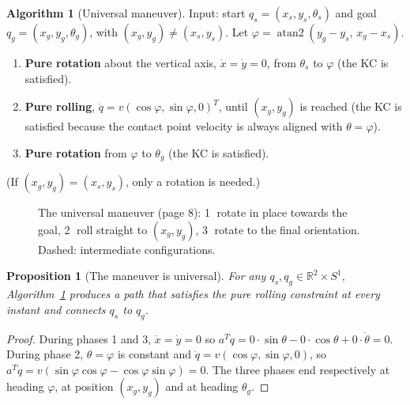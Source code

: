 \documentclass[11pt,a4paper]{article}
\newcommand{\fixedwheel}[2]{\begin{scope}[shift={(#1)},rotate=#2]
  \draw[fill=gray!30] (-0.3,-0.07) rectangle (0.3,0.07);\end{scope}}
\newcommand{\ghostwheel}[2]{\begin{scope}[shift={(#1)},rotate=#2]
  \draw[dashed,gray] (-0.3,-0.07) rectangle (0.3,0.07);\end{scope}}
\theoremstyle{definition}
\newtheorem{algorithm}[definition]{Algorithm}
\theoremstyle{plain}
\newtheorem{proposition}[definition]{Proposition}
\theoremstyle{remark}
\begin{document}
\begin{algorithm}[Universal maneuver]\label{alg:universal}
Input: start $q_s=(x_s,y_s,\theta_s)$ and goal $q_g=(x_g,y_g,\theta_g)$, with $(x_g,y_g)\neq(x_s,y_s)$. Let $\varphi=\operatorname{atan2}(y_g-y_s,\,x_g-x_s)$.
\begin{enumerate}[nosep]
  \item \textbf{Pure rotation} about the vertical axis, $\dot x=\dot y=0$, from $\theta_s$ to $\varphi$ (the KC is satisfied).
  \item \textbf{Pure rolling}, $\dot q=v(\cos\varphi,\sin\varphi,0)^{T}$, until $(x_g,y_g)$ is reached (the KC is satisfied because the contact point velocity is always aligned with $\theta=\varphi$).
  \item \textbf{Pure rotation} from $\varphi$ to $\theta_g$ (the KC is satisfied).
\end{enumerate}
(If $(x_g,y_g)=(x_s,y_s)$, only a rotation is needed.)
\end{algorithm}
 
\begin{figure}[H]
\centering
{}
\caption{The universal maneuver (page 8): \textcircled{1} rotate in place towards the goal, \textcircled{2} roll straight to $(x_g,y_g)$, \textcircled{3} rotate to the final orientation. Dashed: intermediate configurations.}
\end{figure}
 
\begin{proposition}[The maneuver is universal]\label{alg:universal}
For any $q_s,q_g\in\mathbb R^2\times S^1$, Algorithm~\ref{alg:universal} produces a path that satisfies the pure rolling constraint at every instant and connects $q_s$ to $q_g$.
\end{proposition}
\begin{proof}
During phases 1 and 3, $\dot x=\dot y=0$ so $a^{T}\dot q=0\cdot\sin\theta-0\cdot\cos\theta+0\cdot\dot\theta=0$. During phase 2, $\theta=\varphi$ is constant and $\dot q=v(\cos\varphi,\sin\varphi,0)$, so $a^{T}\dot q=v(\sin\varphi\cos\varphi-\cos\varphi\sin\varphi)=0$. The three phases end respectively at heading $\varphi$, at position $(x_g,y_g)$ and at heading $\theta_g$.
\end{proof}
 
\end{document}
